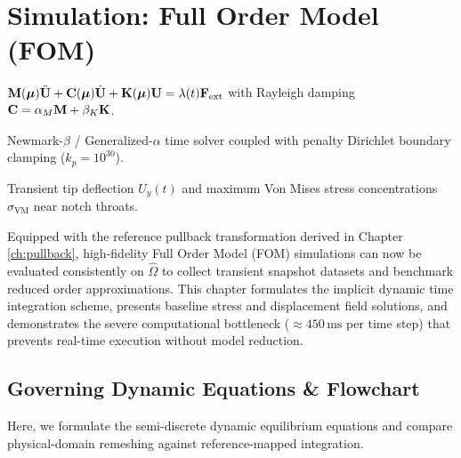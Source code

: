 \chapter{Simulation: Full Order Model (FOM)}
\label{ch:fom}

\begin{tcolorbox}[colback=lightbg, colframe=primaryblue, title=\textbf{Chapter at a Glance: Full Order Model (FOM) Dynamics}, fonttitle=\bfseries]
    \begin{description}[leftmargin=!, labelwidth=3.4cm]
        \item[\textbf{Governing System}] $\mathbf{M}(\boldsymbol{\mu})\ddot{\mathbf{U}} + \mathbf{C}(\boldsymbol{\mu})\dot{\mathbf{U}} + \mathbf{K}(\boldsymbol{\mu})\mathbf{U} = \lambda(t)\mathbf{F}_{\text{ext}}$ with Rayleigh damping $\mathbf{C} = \alpha_M \mathbf{M} + \beta_K \mathbf{K}$.
        \item[\textbf{Implicit Integration}] Newmark-$\beta$ / Generalized-$\alpha$ time solver coupled with penalty Dirichlet boundary clamping ($k_p = 10^{30}$).
        \item[\textbf{Physical QoIs}] Transient tip deflection $U_y(t)$ and maximum Von Mises stress concentrations $\sigma_{\text{VM}}$ near notch throats.
    \end{description}
\end{tcolorbox}

Equipped with the reference pullback transformation derived in Chapter \ref{ch:pullback}, high-fidelity Full Order Model (FOM) simulations can now be evaluated consistently on $\hat{\Omega}$ to collect transient snapshot datasets and benchmark reduced order approximations. This chapter formulates the implicit dynamic time integration scheme, presents baseline stress and displacement field solutions, and demonstrates the severe computational bottleneck ($\approx 450\,\text{ms}$ per time step) that prevents real-time execution without model reduction.

\section{Governing Dynamic Equations \& Flowchart}

Here, we formulate the semi-discrete dynamic equilibrium equations and compare physical-domain remeshing against reference-mapped integration.

